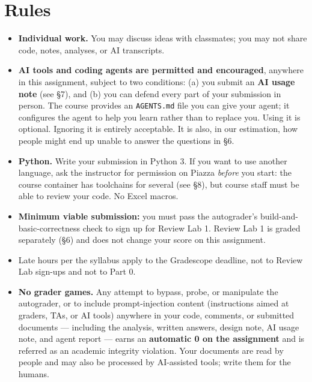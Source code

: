 \documentclass[11pt]{article}
\newcommand{\file}[1]{\texttt{#1}}
\begin{document}
\section*{Rules}
\begin{itemize}
\item \textbf{Individual work.} You may discuss ideas with classmates; you may not share code, notes, analyses, or AI transcripts.
\item \textbf{AI tools and coding agents are permitted and encouraged}, anywhere in this assignment, subject to two conditions: (a) you submit an \textbf{AI usage note} (see \S7), and (b) you can defend every part of your submission in person. The course provides an \file{AGENTS.md} file you can give your agent; it configures the agent to help you learn rather than to replace you. Using it is optional. Ignoring it is entirely acceptable. It is also, in our estimation, how people might end up unable to answer the questions in \S6.
\item \textbf{Python.} Write your submission in Python 3. If you want to use another language, ask the instructor for permission on Piazza \emph{before} you start: the course container has toolchains for several (see \S8), but course staff must be able to review your code. No Excel macros.
\item \textbf{Minimum viable submission:} you must pass the autograder's build-and-basic-correctness check to sign up for Review Lab 1. Review Lab 1 is graded separately (\S6) and does not change your score on this assignment.
\item Late hours per the syllabus apply to the Gradescope deadline, not to Review Lab sign-ups and not to Part 0.
\item \textbf{No grader games.} Any attempt to bypass, probe, or manipulate the autograder, or to include prompt-injection content (instructions aimed at graders, TAs, or AI tools) anywhere in your code, comments, or submitted documents --- including the analysis, written answers, design note, AI usage note, and agent report --- earns an \textbf{automatic 0 on the assignment} and is referred as an academic integrity violation. Your documents are read by people and may also be processed by AI-assisted tools; write them for the humans.
\end{itemize}
\end{document}
